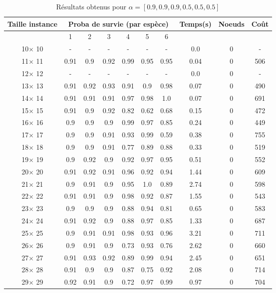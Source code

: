 \documentclass[main.tex]{subfiles}
\begin{document}
\begin{table}
    \centering
    \caption{Résultats obtenus pour $\alpha = [0.9, 0.9, 0.9, 0.5, 0.5, 0.5]$}
    \begin{tabular}{|c|c|c|c|c|c|c|c|c|c|}
	\hline
	\textbf{Taille instance} &\multicolumn{6}{c}{\textbf{Proba de survie (par espèce)}} &\textbf{Temps(s)} &\textbf{Noeuds} &\textbf{Coût}\\
	\hline
	 &1 &2 &3 &4 &5 &6 & & &\\
	\hline

10$\times$ 10 & -  & -  & -  & -  & -  & -  &0.0 &0 & - \\
11$\times$ 11 &0.91 &0.9 &0.92 &0.99 &0.95 &0.95 &0.04 &0 &506\\
12$\times$ 12 & -  & -  & -  & -  & -  & -  &0.0 &0 & - \\
13$\times$ 13 &0.91 &0.92 &0.93 &0.91 &0.9 &0.98 &0.07 &0 &490\\
14$\times$ 14 &0.91 &0.91 &0.91 &0.97 &0.98 &1.0 &0.07 &0 &691\\
15$\times$ 15 &0.91 &0.9 &0.92 &0.82 &0.62 &0.68 &0.15 &0 &472\\
16$\times$ 16 &0.9 &0.9 &0.9 &0.99 &0.97 &0.85 &0.24 &0 &449\\
17$\times$ 17 &0.9 &0.9 &0.91 &0.93 &0.99 &0.59 &0.38 &0 &755\\
18$\times$ 18 &0.9 &0.9 &0.91 &0.77 &0.89 &0.88 &0.33 &0 &519\\
19$\times$ 19 &0.9 &0.92 &0.9 &0.92 &0.97 &0.95 &0.51 &0 &552\\
20$\times$ 20 &0.91 &0.92 &0.91 &0.96 &0.92 &0.94 &1.44 &0 &609\\
21$\times$ 21 &0.9 &0.91 &0.9 &0.95 &1.0 &0.89 &2.74 &0 &598\\
22$\times$ 22 &0.91 &0.91 &0.9 &0.98 &0.92 &0.87 &1.55 &0 &543\\
23$\times$ 23 &0.9 &0.9 &0.9 &0.88 &0.94 &0.81 &0.65 &0 &583\\
24$\times$ 24 &0.91 &0.92 &0.9 &0.88 &0.97 &0.85 &1.33 &0 &687\\
25$\times$ 25 &0.9 &0.91 &0.91 &0.98 &0.93 &0.96 &3.21 &0 &711\\
26$\times$ 26 &0.9 &0.91 &0.9 &0.73 &0.93 &0.76 &2.62 &0 &660\\
27$\times$ 27 &0.91 &0.93 &0.92 &0.89 &0.99 &0.94 &2.45 &0 &651\\
28$\times$ 28 &0.91 &0.9 &0.9 &0.87 &0.75 &0.92 &2.08 &0 &714\\
29$\times$ 29 &0.92 &0.91 &0.9 &0.72 &0.97 &0.99 &0.97 &0 &704\\

\end{tabular}
\end{table}
\end{document}
